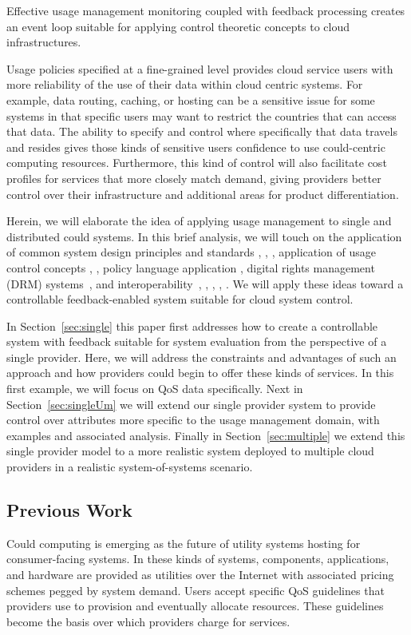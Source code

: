 \documentclass[times, 10pt,twocolumn]{article}
\begin{document}
Effective usage management monitoring coupled with feedback processing creates an event loop suitable for applying control theoretic concepts to cloud infrastructures.

Usage policies specified at a fine-grained level provides cloud service users with more reliability of the use of their data within cloud centric systems.  For example, data routing, caching, or hosting can be a sensitive issue for some systems in that specific users may want to restrict the countries that can access that data.  The ability to specify and control where specifically that data travels and resides gives those kinds of sensitive users confidence to use could-centric computing resources.  Furthermore, this kind of control will also facilitate cost profiles for services that more closely match demand, giving providers better control over their infrastructure and additional areas for product differentiation.

Herein, we will elaborate the idea of applying usage management to single and distributed could systems.  In this brief analysis, we will touch on the application of common system design principles and standards \cite{BlCl:01}, \cite{Cl:88}, \cite{ClWrSoBr:02}, application of usage control concepts \cite{PaSa:04}, \cite{JaHeLa:10}, policy language application \cite{JaHeMa:06}, digital rights management (DRM) systems~\cite{JaHe:09}, and interoperability~\cite{JaHe:04}, \cite{HeJa:05}, \cite{KoLaMaMi:04}, \cite{coral}, \cite{marlin}.  We will apply these ideas toward a controllable feedback-enabled system suitable for cloud system control.

In Section~\ref{sec:single} this paper first addresses how to create a controllable system with feedback suitable for system evaluation from the perspective of a single provider. Here, we will address the constraints and advantages of such an approach and how providers could begin to offer these kinds of services.  In this first example, we will focus on QoS data specifically.  Next in Section~\ref{sec:singleUm} we will extend our single provider system to provide control over attributes more specific to the usage management domain, with examples and associated analysis.  Finally in Section~\ref{sec:multiple} we extend this single provider model to a more realistic system deployed to multiple cloud providers in a realistic system-of-systems scenario.

\subsection{Previous Work}
Could computing is emerging as the future of utility systems hosting for consumer-facing systems.  In these kinds of systems, components, applications, and hardware are provided as utilities over the Internet with associated pricing schemes pegged by system demand.  Users accept specific QoS guidelines that providers use to provision and eventually allocate resources. These guidelines become the basis over which providers charge for services.
\end{document}
